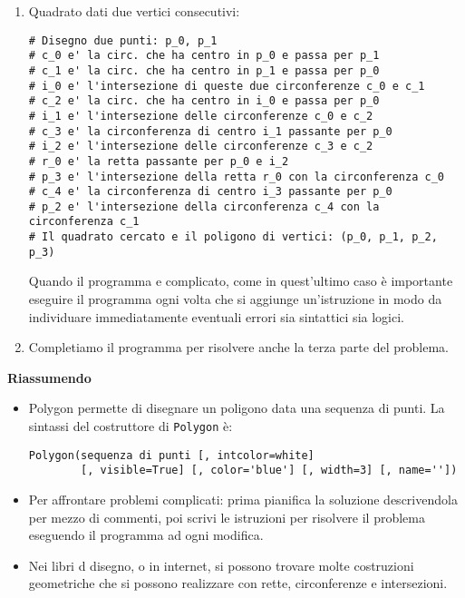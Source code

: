 \begin{enumerate} [noitemsep]
\item Quadrato dati due vertici consecutivi:

\begin{lstlisting}
# Disegno due punti: p_0, p_1
# c_0 e' la circ. che ha centro in p_0 e passa per p_1
# c_1 e' la circ. che ha centro in p_1 e passa per p_0
# i_0 e' l'intersezione di queste due circonferenze c_0 e c_1
# c_2 e' la circ. che ha centro in i_0 e passa per p_0
# i_1 e' l'intersezione delle circonferenze c_0 e c_2
# c_3 e' la circonferenza di centro i_1 passante per p_0
# i_2 e' l'intersezione delle circonferenze c_3 e c_2
# r_0 e' la retta passante per p_0 e i_2
# p_3 e' l'intersezione della retta r_0 con la circonferenza c_0
# c_4 e' la circonferenza di centro i_3 passante per p_0
# p_2 e' l'intersezione della circonferenza c_4 con la circonferenza c_1
# Il quadrato cercato e il poligono di vertici: (p_0, p_1, p_2, p_3)
\end{lstlisting}

Quando il programma e complicato, come in quest'ultimo caso è importante
eseguire il programma ogni volta che si aggiunge un'istruzione in modo
da individuare immediatamente eventuali errori sia sintattici sia logici.

\item Completiamo il programma per risolvere anche la terza parte del problema.

\end{enumerate}

\textbf{Riassumendo}
\begin{itemize} [noitemsep]
\item Polygon permette di disegnare un poligono data una sequenza di punti.
La sintassi del costruttore di \texttt{Polygon} è:

\begin{lstlisting}
Polygon(sequenza di punti [, intcolor=white]
        [, visible=True] [, color='blue'] [, width=3] [, name=''])
\end{lstlisting}

\item Per affrontare problemi complicati: prima pianifica la soluzione
descrivendola per mezzo di commenti, poi scrivi le istruzioni per risolvere
il problema eseguendo il programma ad ogni modifica.

\item Nei libri d disegno, o in internet, si possono trovare molte costruzioni
geometriche che si possono realizzare con rette, circonferenze e
intersezioni.

\end{itemize}


